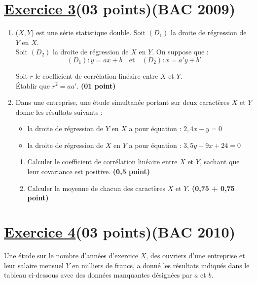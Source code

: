 \documentclass[12pt,a4paper]{article}
\newcounter{exercice}                                   %
\begin{document}
\section*{\underline{Exercice 3}(03 points)(BAC 2009)}

\vspace{0.3cm}

\begin{enumerate}
    \item (\(X, Y\)) est une série statistique double. Soit \( (D_1) \) la droite de régression de \( Y \) en \( X \).\\

    Soit \( (D_2) \) la droite de régression de \( X \) en \( Y \). On suppose que :
    \[
    (D_1) : y = a x + b \quad \text{et} \quad (D_2) : x = a' y + b'
    \]
    
    Soit \( r \) le coefficient de corrélation linéaire entre \( X \) et \( Y \).\\
    
    Établir que \( r^2 = aa' \). \hfill \textbf{(01 point)}
    
    \item Dans une entreprise, une étude simultanée portant sur deux caractères \( X \) et \( Y \) donne les résultats suivants :
    \begin{itemize}
        \item la droite de régression de \( Y \) en \( X \) a pour équation : \( 2{,}4x - y = 0 \)
        \item la droite de régression de \( X \) en \( Y \) a pour équation : \( 3{,}5y - 9x + 24 = 0 \)
    \end{itemize}

    \begin{enumerate}
        \item Calculer le coefficient de corrélation linéaire entre \( X \) et \( Y \), sachant que leur covariance est positive. \hfill \textbf{(0,5 point)}
        
        \item Calculer la moyenne de chacun des caractères \( X \) et \( Y \). \hfill \textbf{(0,75 + 0,75 point)}
    \end{enumerate}
\end{enumerate}
\section*{\underline{Exercice 4}(03 points)(BAC 2010)}
Une étude sur le nombre d’années d’exercice \( X \), des ouvriers d’une entreprise et leur salaire mensuel \( Y \) en milliers de francs, a donné les résultats indiqués dans le tableau ci-dessous avec des données manquantes désignées par \( a \) et \( b \).
\end{document}
